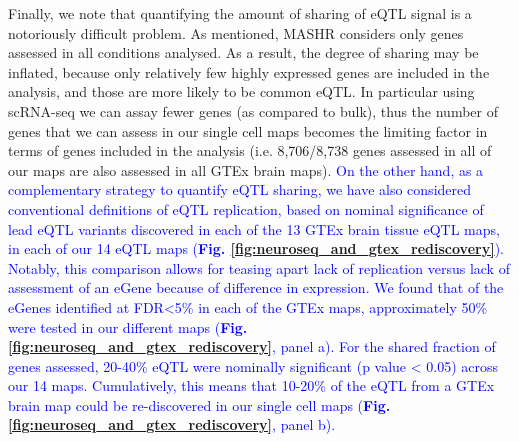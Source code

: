 Finally, we note that quantifying the amount of sharing of eQTL signal is a notoriously difficult problem.
As mentioned, MASHR considers only genes assessed in all conditions analysed. 
As a result, the degree of sharing may be inflated, because only relatively few highly expressed genes are included in the analysis, and those are more likely to be common eQTL. 
In particular using scRNA-seq we can assay fewer genes (as compared to bulk), thus the number of genes that we can assess in our single cell maps becomes the limiting factor in terms of genes included in the analysis (i.e. 8,706/8,738 genes assessed in all of our maps are also assessed in all GTEx brain maps).
\textcolor{blue}{On the other hand, as a complementary strategy to quantify eQTL sharing, we have also considered conventional definitions of eQTL replication, based on nominal significance of lead eQTL variants discovered in each of the 13 GTEx brain tissue eQTL maps, in each of our 14 eQTL maps (\textbf{Fig. \ref{fig:neuroseq_and_gtex_rediscovery}}).
Notably, this comparison allows for teasing apart lack of replication versus lack of assessment of an eGene because of difference in expression. We found that of the eGenes identified at FDR<5\% in each of the GTEx maps, approximately 50\% were tested in our different maps (\textbf{Fig. \ref{fig:neuroseq_and_gtex_rediscovery}}, panel a).
For the shared fraction of genes assessed, 20-40\% eQTL were nominally significant (p value < 0.05) across our 14 maps. 
Cumulatively, this means that 10-20\% of the eQTL from a GTEx brain map could be re-discovered in our single cell maps (\textbf{Fig. \ref{fig:neuroseq_and_gtex_rediscovery}}, panel b).}


